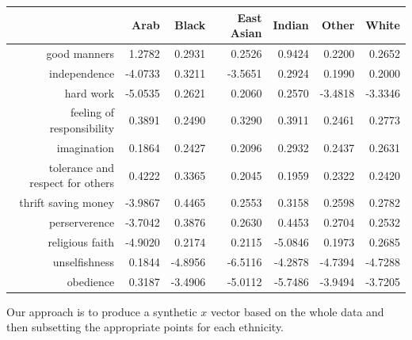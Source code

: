 \documentclass{amsart}
\begin{document}
\begin{table}[ht]
\centering
\begin{tabular}{rrrrrrr}
  \hline
 & Arab & Black & East Asian & Indian & Other & White \\ 
  \hline
good manners & 1.2782 & 0.2931 & 0.2526 & 0.9424 & 0.2200 & 0.2652 \\ 
  independence & -4.0733 & 0.3211 & -3.5651 & 0.2924 & 0.1990 & 0.2000 \\ 
  hard work & -5.0535 & 0.2621 & 0.2060 & 0.2570 & -3.4818 & -3.3346 \\ 
  feeling of responsibility & 0.3891 & 0.2490 & 0.3290 & 0.3911 & 0.2461 & 0.2773 \\ 
  imagination & 0.1864 & 0.2427 & 0.2096 & 0.2932 & 0.2437 & 0.2631 \\ 
  tolerance and respect for others & 0.4222 & 0.3365 & 0.2045 & 0.1959 & 0.2322 & 0.2420 \\ 
  thrift saving money & -3.9867 & 0.4465 & 0.2553 & 0.3158 & 0.2598 & 0.2782 \\ 
  perserverence & -3.7042 & 0.3876 & 0.2630 & 0.4453 & 0.2704 & 0.2532 \\ 
  religious faith & -4.9020 & 0.2174 & 0.2115 & -5.0846 & 0.1973 & 0.2685 \\ 
  unselfishness & 0.1844 & -4.8956 & -6.5116 & -4.2878 & -4.7394 & -4.7288 \\ 
  obedience & 0.3187 & -3.4906 & -5.0112 & -5.7486 & -3.9494 & -3.7205 \\ 
   \hline
\end{tabular}
\end{table}

Our approach is to produce a synthetic $x$ vector based on the whole data and then subsetting the appropriate points for each ethnicity.  



\begin{thebibliography}{CCC}
\end{thebibliography}
\end{document}
